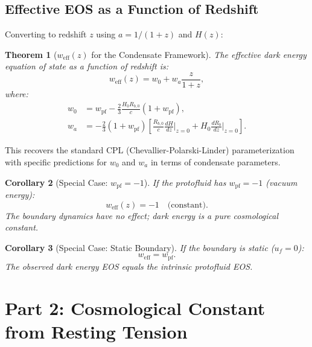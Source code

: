 \documentclass[11pt,a4paper]{article}
\newcommand{\wpf}{\ensuremath{w_{\mathrm{pf}}}}
\newcommand{\weff}{\ensuremath{w_{\mathrm{eff}}}}
\newtheorem{theorem}{Theorem}[section]
\newtheorem{corollary}[theorem]{Corollary}
\theoremstyle{definition}
\theoremstyle{remark}
\begin{document}
\subsection{Effective EOS as a Function of Redshift}
\label{sec:weff_redshift}

Converting to redshift $z$ using $a = 1/(1+z)$ and $H(z)$:

\begin{theorem}[$\weff(z)$ for the Condensate Framework]
\label{thm:weff_z}
The effective dark energy equation of state as a function of redshift is:
\begin{equation}
\label{eq:weff_z}
\boxed{\weff(z) = w_0 + w_a \frac{z}{1+z},}
\end{equation}
where:
\begin{align}
w_0 &= \wpf - \frac{2}{3}\frac{H_0 R_{b,0}}{c}(1 + \wpf), \label{eq:w0_definition} \\
w_a &= -\frac{2}{3}(1 + \wpf)\left[\frac{R_{b,0}}{c}\frac{dH}{dz}\bigg|_{z=0} + H_0 \frac{dR_b}{dz}\bigg|_{z=0}\right]. \label{eq:wa_definition}
\end{align}
\end{theorem}

This recovers the standard CPL (Chevallier-Polarski-Linder) parameterization \cite{Chevallier2001,Linder2003} with specific predictions for $w_0$ and $w_a$ in terms of condensate parameters.

\begin{corollary}[Special Case: $\wpf = -1$]
\label{cor:wpf_minus1}
If the protofluid has $\wpf = -1$ (vacuum energy):
\begin{equation}
\weff(z) = -1 \quad \text{(constant)}.
\end{equation}
The boundary dynamics have no effect; dark energy is a pure cosmological constant.
\end{corollary}

\begin{corollary}[Special Case: Static Boundary]
\label{cor:static_boundary}
If the boundary is static ($u_f = 0$):
\begin{equation}
\weff = \wpf.
\end{equation}
The observed dark energy EOS equals the intrinsic protofluid EOS.
\end{corollary}

\section{Part 2: Cosmological Constant from Resting Tension}
\label{sec:lambda_from_tension}
\end{document}
